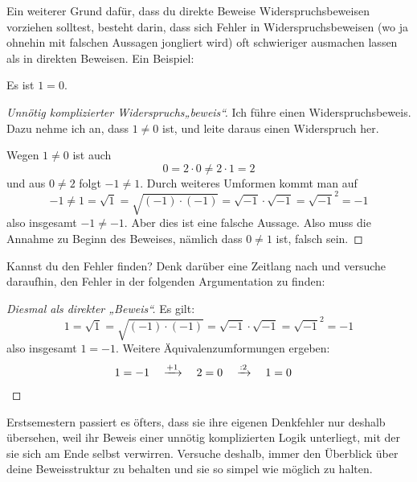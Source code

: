   
\begin{bsp}[*]
    Ein weiterer Grund dafür, dass du direkte Beweise Widerspruchsbeweisen vorziehen solltest, besteht darin, dass sich Fehler in Widerspruchsbeweisen (wo ja ohnehin mit falschen Aussagen jongliert wird) oft schwieriger ausmachen lassen als in direkten Beweisen. Ein Beispiel:
    \begin{satz}
        Es ist $1=0$.
    \end{satz}
    \begin{proof}[Unnötig komplizierter Widerspruchs„beweis“]\let\qed\relax
        Ich führe einen Widerspruchsbeweis. Dazu nehme ich an, dass $1\neq 0$ ist, und leite daraus einen Widerspruch her.
        
        Wegen $1\neq 0$ ist auch
            \[ 0 = 2\cdot 0 \neq 2\cdot 1 = 2 \]
        und aus $0\neq 2$ folgt $-1\neq 1$. Durch weiteres Umformen kommt man auf
            \[ -1 \neq 1 = \sqrt{1} = \sqrt{(-1)\cdot (-1)} = \sqrt{-1} \cdot \sqrt{-1} = \sqrt{-1}^2 = -1 \]
        also insgesamt $-1\neq -1$. Aber dies ist eine falsche Aussage. Also muss die Annahme zu Beginn des Beweises, nämlich dass $0\neq 1$ ist, falsch sein. 
    \end{proof}
    Kannst du den Fehler finden? Denk darüber eine Zeitlang nach und versuche daraufhin, den Fehler in der folgenden Argumentation zu finden:
    \begin{proof}[Diesmal als direkter „Beweis“]\let\qed\relax
        Es gilt:
            \[ 1 = \sqrt{1} = \sqrt{(-1)\cdot (-1)} = \sqrt{-1}\cdot \sqrt{-1} = \sqrt{-1}^2 = -1 \]
        also insgesamt $1=-1$. Weitere Äquivalenzumformungen ergeben:
        \begin{align*}
            1 & = -1 \quad\xrightarrow{+1}\quad 2=0 \quad\xrightarrow{:2}\quad 1=0 \qedhere
        \end{align*}
    \end{proof}
    Erstsemestern passiert es öfters, dass sie ihre eigenen Denkfehler nur deshalb übersehen, weil ihr Beweis einer unnötig komplizierten Logik unterliegt, mit der sie sich am Ende selbst verwirren. Versuche deshalb, immer den Überblick über deine Beweisstruktur zu behalten und sie so simpel wie möglich zu halten.
\end{bsp}


